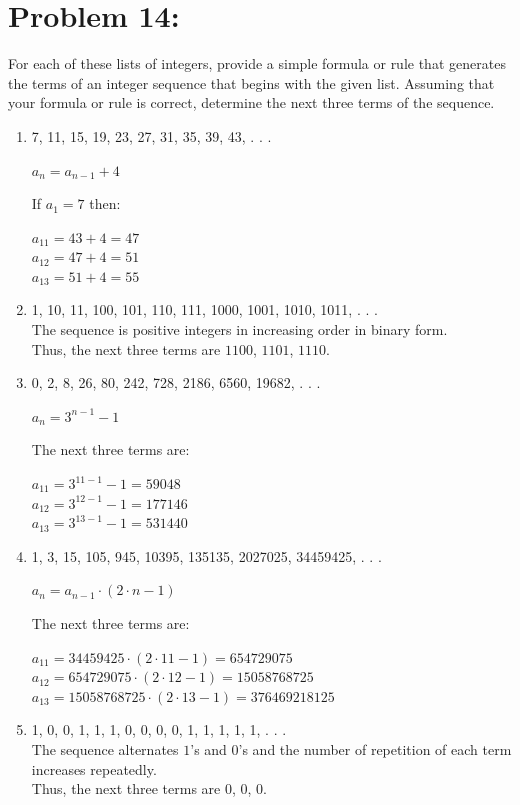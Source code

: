 \documentclass[12pt,en,a4paper]{article}
\begin{document}
	\section*{Problem 14:}
	For each of these lists of integers, provide a simple formula or rule that generates the terms of an integer sequence that begins with the given list. Assuming that your formula or rule is correct, determine the next three terms of the sequence.
	\begin{enumerate}
		\item 7, 11, 15, 19, 23, 27, 31, 35, 39, 43, . . .
		\begin{center}
			$a_{n}=a_{n-1} +4$
		\end{center}
		If $a_1 =7$ then:
		\begin{center}
			$a_{11} = 43+4=47$\\
			$a_{12} = 47+4=51$\\
			$a_{13} = 51+4=55$
		\end{center}
		\item 1, 10, 11, 100, 101, 110, 111, 1000, 1001, 1010, 1011, . . .\\
		The sequence is positive integers in increasing order in binary form.\\
		Thus, the next three terms are $1100$, $1101$, $1110$.
		\item 0, 2, 8, 26, 80, 242, 728, 2186, 6560, 19682, . . .
		\begin{center}
			$a_n =3^{n-1}-1$
		\end{center}
		The next three terms are:
		\begin{center}
			$a_{11}=3^{11-1}-1=59048$\\
			$a_{12}=3^{12-1}-1=177146$\\
			$a_{13}=3^{13-1}-1=531440$
		\end{center}
		\item 1, 3, 15, 105, 945, 10395, 135135, 2027025, 34459425, . . .
		\begin{center}
			$a_n=a_{n-1}\cdot(2\cdot n-1)$
		\end{center}
		The next three terms are:
		\begin{center}
			$a_{11}=34459425\cdot(2\cdot11 -1)=654729075$\\
			$a_{12}=654729075\cdot(2\cdot12 -1)=15058768725$\\
			$a_{13}=15058768725\cdot(2\cdot 13-1)=376469218125$
		\end{center}
		\item 1, 0, 0, 1, 1, 1, 0, 0, 0, 0, 1, 1, 1, 1, 1, . . .\\
		The sequence alternates $1$'s and $0$'s and the number of repetition of each term increases repeatedly.\\
		Thus, the next three terms are $0$, $0$, $0$.
	\end{enumerate}
\newpage
{}
\end{document}
